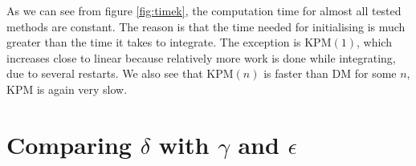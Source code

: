 As we can see from figure \ref{fig:timek}, the computation time for almost all tested methods are constant. The reason is that the time needed for initialising is much greater than the time it takes to integrate. 
The exception is KPM$(1)$, which increases close to linear because relatively more work is done while integrating, due to several restarts.
We also see that KPM$(n)$ is faster than DM for some $n$, KPM is again very slow.
\section{Comparing $\delta$ with $\gamma$ and $\epsilon$} \label{sec:div}
